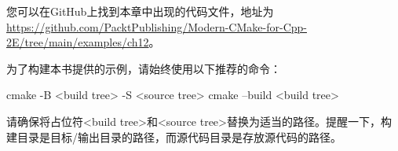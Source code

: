 您可以在GitHub上找到本章中出现的代码文件，地址为 \url{https://github.com/PacktPublishing/Modern-CMake-for-Cpp-2E/tree/main/examples/ch12}。

为了构建本书提供的示例，请始终使用以下推荐的命令：

\begin{shell}
cmake -B <build tree> -S <source tree>
cmake --build <build tree>
\end{shell}

请确保将占位符<build tree>和<source tree>替换为适当的路径。提醒一下，构建目录是目标/输出目录的路径，而源代码目录是存放源代码的路径。

